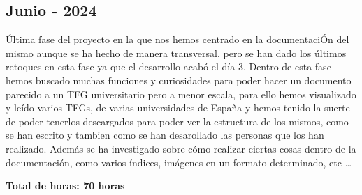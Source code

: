 \documentclass[a4paper]{article}
\begin{document}
\subsection{Junio - 2024}
Última fase del proyecto en la que nos hemos centrado en la documentaciÓn del mismo aunque se ha hecho de manera transversal, pero se han dado los últimos retoques en esta fase ya que el desarrollo acabó el día 3. Dentro de esta fase hemos buscado muchas funciones y curiosidades para poder hacer un documento parecido a un TFG universitario pero a menor escala, para ello hemos visualizado y leído varios TFGs, de varias universidades de España y hemos tenido la suerte de poder tenerlos descargados para poder ver la estructura de los mismos, como se han escrito y tambien como se han desarollado las personas que los han realizado. Además se ha investigado sobre cómo realizar ciertas cosas dentro de la documentación, como varios índices, imágenes en un formato determinado, etc \dots
\begin{flushright}
    \bf Total de horas: 70 horas
\end{flushright}
\end{document}
